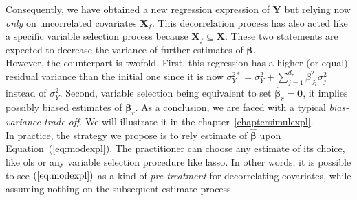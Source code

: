 \documentclass[12pt,a4paper]{report}
\begin{document}
Consequently, we have obtained a new regression expression of $\boldsymbol{Y}$ but relying now {\it only} on uncorrelated covariates $\boldsymbol{X}_f$. This decorrelation process has also acted like a specific variable selection process because $\boldsymbol{X}_f \subseteq \boldsymbol{X}$. These two statements are expected to decrease the variance of further estimates of $\boldsymbol{\beta}$.\\

 However, the counterpart is twofold. First, this regression has a higher (or equal) residual variance than the initial one since it is now $\sigma^{2*}_Y=\sigma^2_Y+\sum_{j =1}^{d_r}\beta_{J_r^j}^2\sigma^2_j$ instead of $\sigma^2_Y$. Second, variable selection being equivalent to set $\hat{\boldsymbol{\beta}}_r=\boldsymbol{0}$, it implies possibly biased estimates of $\boldsymbol{\beta}_r$. As a conclusion, we are faced with a typical {\it bias-variance trade off}. We will illustrate it in the chapter~\ref{chaptersimulexpl}.\\


In practice, the strategy we propose is to rely estimate of  $\hat{\boldsymbol{\beta}}$ upon Equation~(\ref{eq:modexpl}). The practitioner can choose any estimate of its choice, like {\sc ols} or any variable selection procedure like {\sc lasso}. In other words, it is possible to see $(\ref{eq:modexpl})$ as a kind of {\it pre-treatment} for decorrelating covariates, while assuming nothing on the subsequent estimate process.\\

\end{document}

